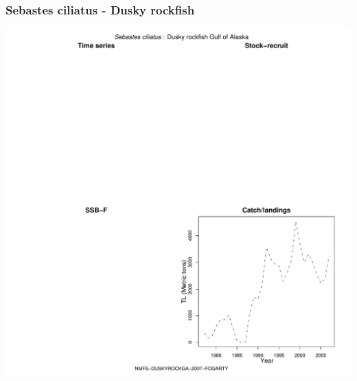 \subsubsection{Sebastes ciliatus - Dusky rockfish}
\begin{center}
\includegraphics[width=1.2\textwidth]{../R/figures/NMFS-DUSKYROCKGA-2007-FOGARTY.pdf}
\end{center}

